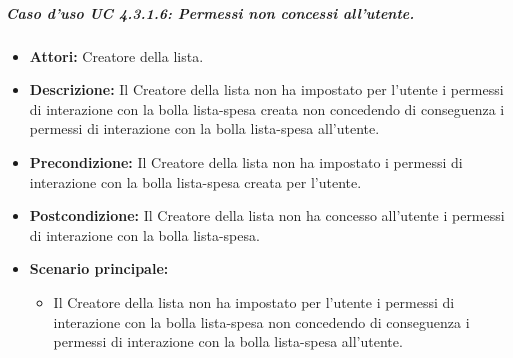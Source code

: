 \subparagraph{Caso d'uso UC 4.3.1.6: Permessi non concessi all'utente.}
\label{Caso d'uso UC 4.3.1.6: Permessi non concessi all'utente.}

\FloatBarrier
\begin{itemize}
\item \textbf{Attori:} Creatore della lista.
\item \textbf{Descrizione:} Il Creatore della lista non ha impostato per l'utente i permessi di interazione con la bolla lista-spesa creata non concedendo di conseguenza i permessi di interazione con la bolla lista-spesa all'utente.
\item \textbf{Precondizione:} Il Creatore della lista non ha impostato i permessi di interazione con la bolla lista-spesa creata per l'utente.
\item \textbf{Postcondizione:} Il Creatore della lista non ha concesso all'utente i permessi di interazione con la bolla lista-spesa.
\item \textbf{Scenario principale:}
\begin{itemize}
\item Il Creatore della lista non ha impostato per l'utente i permessi di interazione con la bolla lista-spesa non concedendo di conseguenza i permessi di interazione con la bolla lista-spesa all'utente.
\end{itemize}
\end{itemize}
